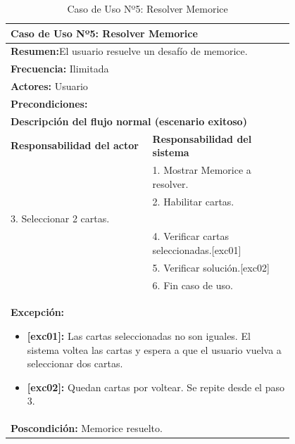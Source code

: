 \begin{table}[H]
    \centering
    \caption{Caso de Uso Nº5: Resolver Memorice}
    \vspace{10pt}
    \begin{tabular}{| p{0.4\linewidth} | p{0.4\linewidth} |}
        \hline
        \multicolumn{2}{|l|}{\textbf{Caso de Uso Nº5:}  Resolver Memorice} \\
        \hline
        \multicolumn{2}{|l|}{\textbf{Resumen:}El usuario resuelve un desafío de memorice.} \\
        \hline
        \multicolumn{2}{|l|}{\textbf{Frecuencia:}  Ilimitada} \\
        \hline
        \multicolumn{2}{|l|}{\textbf{Actores:}  Usuario} \\
        \hline
        \multicolumn{2}{|l|}{\textbf{Precondiciones:}} \\
        \hline
        \multicolumn{2}{|l|}{\textbf{Descripción del flujo normal (escenario exitoso)} } \\
        \hline
        \textbf{Responsabilidad del actor} & \textbf{Responsabilidad del sistema}\\
            & 1. Mostrar Memorice a resolver.\\
            & 2. Habilitar cartas. \\
        3. Seleccionar 2 cartas.&\\
            & 4. Verificar cartas seleccionadas.[exc01]\\
            & 5. Verificar solución.[exc02]\\
            & 6. Fin caso de uso. \\
        \hline
        \multicolumn{2}{|p{0.8\linewidth}|}{
            \textbf{Excepción:}
            \begin{itemize}
                \item \textbf{[exc01]:} Las cartas seleccionadas no son iguales. El sistema voltea las cartas y espera a que el usuario vuelva a seleccionar dos cartas.
                \item \textbf{[exc02]:} Quedan cartas por voltear. Se repite desde el paso 3.
            \end{itemize}}\\
            \hline
        \multicolumn{2}{|l|}{\textbf{Poscondición:}  Memorice resuelto.} \\
        \hline
    \end{tabular}

    \label{table:5}
\end{table}

